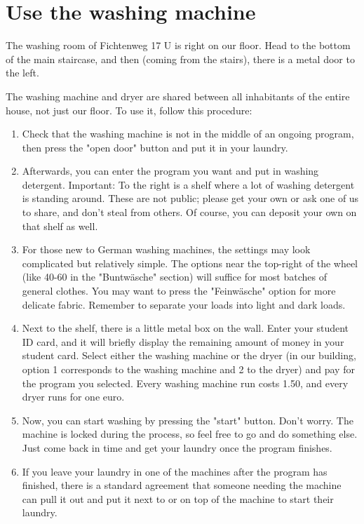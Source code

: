 \section{Use the washing machine}
The washing room of Fichtenweg 17 U is right on our floor. Head to the bottom of the main staircase, and then (coming from the stairs), there is a metal door to the left.

The washing machine and dryer are shared between all inhabitants of the entire house, not just our floor. To use it, follow this procedure:
\begin{enumerate}
    \item Check that the washing machine is not in the middle of an ongoing program, then press the "open door" button and put it in your laundry.
    
    \item Afterwards, you can enter the program you want and put in washing detergent. Important: To the right is a shelf where a lot of washing detergent is standing around. These are not public; please get your own or ask one of us to share, and don't steal from others. Of course, you can deposit your own on that shelf as well. 
    
    \item For those new to German washing machines, the settings may look complicated but relatively simple. The options near the top-right of the wheel (like 40-60 in the "Buntwäsche" section) will suffice for most batches of general clothes. You may want to press the "Feinwäsche" option for more delicate fabric. Remember to separate your loads into light and dark loads.
    
    \item Next to the shelf, there is a little metal box on the wall. Enter your student ID card, and it will briefly display the remaining amount of money in your student card. Select either the washing machine or the dryer (in our building, option 1 corresponds to the washing machine and 2 to the dryer) and pay for the program you selected. Every washing machine run costs 1.50, and every dryer runs for one euro.
    
    \item Now, you can start washing by pressing the "start" button. Don't worry. The machine is locked during the process, so feel free to go and do something else. Just come back in time and get your laundry once the program finishes.
    
    \item If you leave your laundry in one of the machines after the program has finished, there is a standard agreement that someone needing the machine can pull it out and put it next to or on top of the machine to start their laundry.


\end{enumerate}
